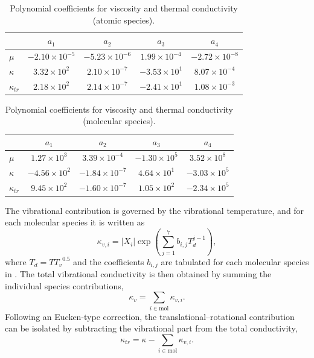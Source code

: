\begin{table}[ht]
    \centering
    \caption{Polynomial coefficients for viscosity and thermal conductivity (atomic species).}
    \label{tab:present_model_coeffs_atom}
    \renewcommand{\arraystretch}{1.2}
    \begin{tabular}{l c c c c}
        \toprule
        & $a_1$ & $a_2$ & $a_3$ & $a_4$ \\
        \midrule
        $\mu$ & $-2.10 \times 10^{-5}$ & $-5.23 \times 10^{-6}$ & $1.99 \times 10^{-4}$ & $-2.72 \times 10^{-8}$ \\
        $\kappa$ & $3.32 \times 10^{2}$ & $2.10 \times 10^{-7}$ & $-3.53 \times 10^{1}$ & $8.07 \times 10^{-4}$ \\
        $\kappa_{tr}$ & $2.18 \times 10^{2}$ & $2.14 \times 10^{-7}$ & $-2.41 \times 10^{1}$ & $1.08 \times 10^{-3}$ \\
        \bottomrule
    \end{tabular}
\end{table}

\begin{table}[ht]
    \centering
    \caption{Polynomial coefficients for viscosity and thermal conductivity (molecular species).}
    \label{tab:present_model_coeffs_mol}
    \renewcommand{\arraystretch}{1.2}
    \begin{tabular}{l c c c c}
        \toprule
        & $a_1$ & $a_2$ & $a_3$ & $a_4$ \\
        \midrule
        $\mu$ & $1.27 \times 10^{3}$ & $3.39 \times 10^{-4}$ & $-1.30 \times 10^{5}$ & $3.52 \times 10^{8}$ \\
        $\kappa$ & $-4.56 \times 10^{2}$ & $-1.84 \times 10^{-7}$ & $4.64 \times 10^{1}$ & $-3.03 \times 10^{5}$ \\
        $\kappa_{tr}$ & $9.45 \times 10^{2}$ & $-1.60 \times 10^{-7}$ & $1.05 \times 10^{2}$ & $-2.34 \times 10^{5}$ \\
        \bottomrule
    \end{tabular}
\end{table}

The vibrational contribution is governed by the vibrational temperature, and for each molecular species it is written as
\begin{equation}
\kappa_{v,i} = |X_i| \exp\left(\sum_{j=1}^{7} b_{i,j} T_d^{j-1}\right),
\label{eq:kappa_vi}
\end{equation}
where $T_d = {T T_v} ^{0.5}$ and the coefficients $b_{i,j}$ are tabulated for each molecular species in . The total vibrational conductivity is then obtained by summing the individual species contributions,
\begin{equation}
\kappa_v = \sum_{i \in \mathrm{mol}} \kappa_{v,i}.
\label{eq:kappa_v}
\end{equation}
Following an Eucken-type correction, the translational--rotational contribution can be isolated by subtracting the vibrational part from the total conductivity,
\begin{equation}
\kappa_{tr} = \kappa - \sum_{i \in \mathrm{mol}} \kappa_{v,i}.
\label{eq:kappa_tr}
\end{equation}

